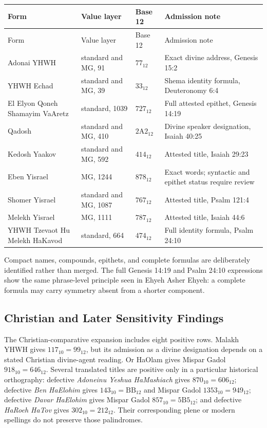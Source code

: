 \begin{center}
\footnotesize
\begin{longtable}{>{\raggedright\arraybackslash}p{3.6cm}>{\raggedright\arraybackslash}p{2.7cm}>{\raggedright\arraybackslash}p{2.2cm}>{\raggedright\arraybackslash}p{5.0cm}}
\toprule
Form & Value layer & Base 12 & Admission note \\
\midrule
\endfirsthead
\toprule
Form & Value layer & Base 12 & Admission note \\
\midrule
\endhead
Adonai YHWH & standard and MG, 91 & $77_{12}$ & Exact divine address, Genesis 15:2 \\
YHWH Echad & standard and MG, 39 & $33_{12}$ & Shema identity formula, Deuteronomy 6:4 \\
El Elyon Qoneh Shamayim VaAretz & standard, 1039 & $727_{12}$ & Full attested epithet, Genesis 14:19 \\
Qadosh & standard and MG, 410 & $2\mathrm{A}2_{12}$ & Divine speaker designation, Isaiah 40:25 \\
Kedosh Yaakov & standard and MG, 592 & $414_{12}$ & Attested title, Isaiah 29:23 \\
Eben Yisrael & MG, 1244 & $878_{12}$ & Exact words; syntactic and epithet status require review \\
Shomer Yisrael & standard and MG, 1087 & $767_{12}$ & Attested title, Psalm 121:4 \\
Melekh Yisrael & MG, 1111 & $787_{12}$ & Attested title, Isaiah 44:6 \\
YHWH Tzevaot Hu Melekh HaKavod & standard, 664 & $474_{12}$ & Full identity formula, Psalm 24:10 \\
\bottomrule
\end{longtable}
\end{center}

Compact names, compounds, epithets, and complete formulas are deliberately identified rather than merged. The full Genesis 14:19 and Psalm 24:10 expressions show the same phrase-level principle seen in Ehyeh Asher Ehyeh: a complete formula may carry symmetry absent from a shorter component.

\subsection{Christian and Later Sensitivity Findings}

The Christian-comparative expansion includes eight positive rows. Malakh YHWH gives $117_{10}=99_{12}$, but its admission as a divine designation depends on a stated Christian divine-agent reading. Or HaOlam gives Mispar Gadol $918_{10}=646_{12}$. Several translated titles are positive only in a particular historical orthography: defective \textit{Adoneinu Yeshua HaMashiach} gives $870_{10}=606_{12}$; defective \textit{Ben HaElohim} gives $143_{10}=\mathrm{BB}_{12}$ and Mispar Gadol $1353_{10}=949_{12}$; defective \textit{Davar HaElohim} gives Mispar Gadol $857_{10}=5\mathrm{B}5_{12}$; and defective \textit{HaRoeh HaTov} gives $302_{10}=212_{12}$. Their corresponding plene or modern spellings do not preserve those palindromes.

